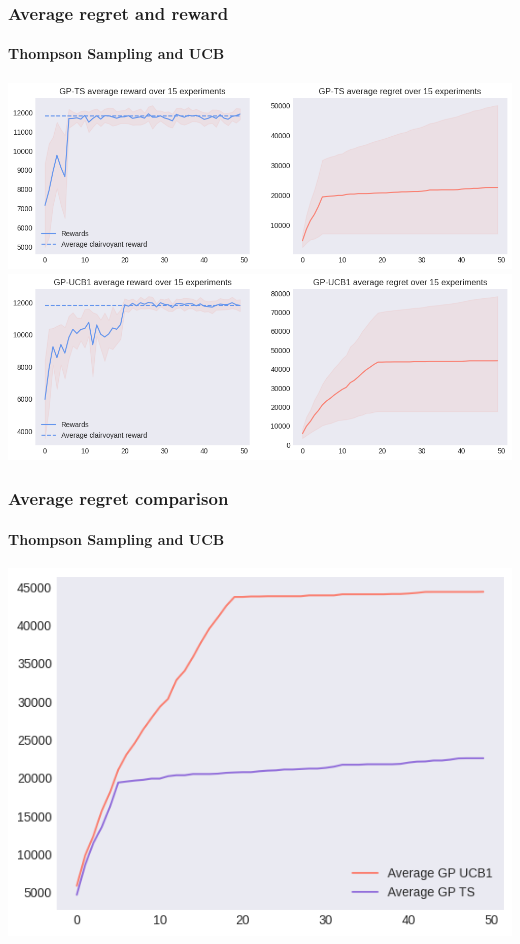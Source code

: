 \begin{frame}[plain]

\frametitle{Average regret and reward}
\framesubtitle{Thompson Sampling and UCB}

\begin{center}
	\hspace*{-1em}
	\includegraphics[scale=0.42]{img/Graphs/uncertain_alpha/image4.png}
	\hspace*{-1em}
	\includegraphics[scale=0.42]{img/Graphs/uncertain_alpha/image5.png}
\end{center}

\end{frame}


\begin{frame}[plain]

\frametitle{Average regret comparison}
\framesubtitle{Thompson Sampling and UCB}

\begin{center}
	\hspace*{-2.8em}
	\includegraphics[scale=0.55]{img/Graphs/uncertain_alpha/image6.png}
\end{center}

\end{frame}

